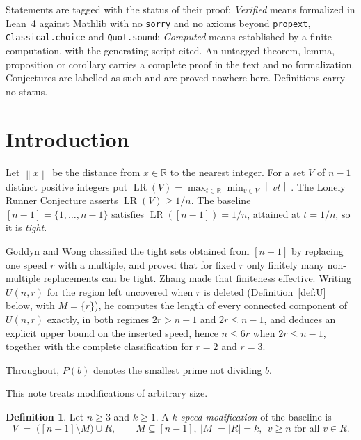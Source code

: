 \documentclass[11pt]{amsart}
\theoremstyle{plain}
\theoremstyle{definition}
\newtheorem{definition}[theorem]{Definition}
\newcommand{\LR}{\operatorname{LR}}
\newcommand{\nrm}[1]{\left\lVert #1 \right\rVert}
\newcommand{\R}{\mathbb{R}}
\begin{document}
Statements are tagged with the status of their proof: \emph{Verified} means formalized in Lean~4
against Mathlib with no \texttt{sorry} and no axioms beyond \texttt{propext},
\texttt{Classical.choice} and \texttt{Quot.sound}; \emph{Computed} means established by a finite
computation, with the generating script cited. An untagged theorem, lemma, proposition or corollary
carries a complete proof in the text and no formalization. Conjectures are labelled as such and are
proved nowhere here. Definitions carry no status.


\date{18 October 2026. Preprint, not peer reviewed.}
\maketitle

\section{Introduction}

Let $\nrm{x}$ be the distance from $x\in\R$ to the nearest integer. For a set $V$ of $n-1$ distinct
positive integers put $\LR(V)=\max_{t\in\R}\min_{v\in V}\nrm{vt}$. The Lonely Runner Conjecture
asserts $\LR(V)\ge 1/n$. The baseline $[n-1]=\{1,\dots,n-1\}$ satisfies $\LR([n-1])=1/n$, attained at
$t=1/n$, so it is \emph{tight}.

Goddyn and Wong \cite{gw} classified the tight sets obtained from $[n-1]$ by replacing one speed $r$
with a multiple, and proved that for fixed $r$ only finitely many non-multiple replacements can be
tight. Zhang \cite{zhang} made that finiteness effective. Writing $U(n,r)$ for the region left uncovered when $r$ is deleted (Definition~\ref{def:U} below,
with $M=\{r\}$), he computes the length of every connected component of $U(n,r)$ exactly, in
both regimes $2r>n-1$ and $2r\le n-1$, and deduces an explicit upper bound on the inserted speed, hence $n\le 6r$ when $2r\le n-1$,
together with the complete classification for $r=2$ and $r=3$.

Throughout, $P(b)$ denotes the smallest prime not dividing $b$.

This note treats modifications of arbitrary size.

\begin{definition}\label{def:mod}
Let $n\ge 3$ and $k\ge1$. A \emph{$k$-speed modification} of the baseline is
\[
  V\;=\;\bigl([n-1]\setminus M\bigr)\cup R,\qquad M\subseteq[n-1],\ |M|=|R|=k,\ \ v\ge n \text{ for all } v\in R .
\]
\end{definition}
\end{document}
